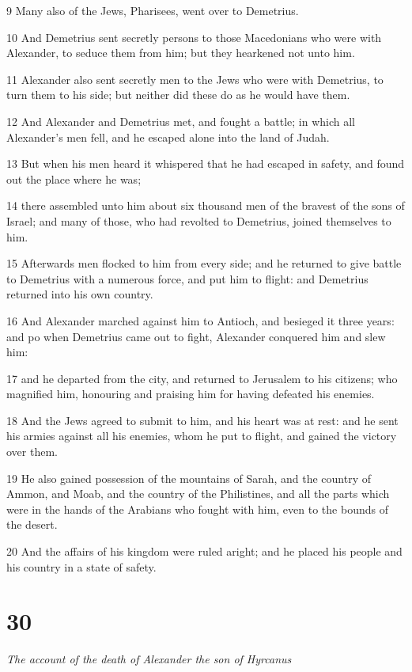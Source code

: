 9 Many also of the Jews, Pharisees, went over to Demetrius. 

10 And Demetrius sent secretly persons to those Macedonians who were with Alexander, to seduce them from him; but they hearkened not unto him. 

11 Alexander also sent secretly men to the Jews who were with Demetrius, to turn them to his side; but neither did these do as he would have them. 

12 And Alexander and Demetrius met, and fought a battle; in which all Alexander’s men fell, and he escaped alone into the land of Judah. 

13 But when his men heard it whispered that he had escaped in safety, and found out the place where he was; 

14 there assembled unto him about six thousand men of the bravest of the sons of Israel; and many of those, who had revolted to Demetrius, joined themselves to him. 

15 Afterwards men flocked to him from every side; and he returned to give battle to Demetrius with a numerous force, and put him to flight: and Demetrius returned into his own country. 

16 And Alexander marched against him to Antioch, and besieged it three years: and po when Demetrius came out to fight, Alexander conquered him and slew him: 

17 and he departed from the city, and returned to Jerusalem to his citizens; who magnified him, honouring and praising him for having defeated his enemies. 

18 And the Jews agreed to submit to him, and his heart was at rest: and he sent his armies against all his enemies, whom he put to flight, and gained the victory over them. 

19 He also gained possession of the mountains of Sarah, and the country of Ammon, and Moab, and the country of the Philistines, and all the parts which were in the hands of the Arabians who fought with him, even to the bounds of the desert. 

20 And the affairs of his kingdom were ruled aright; and he placed his people and his country in a state of safety. 

\chapter{30}

\par \textit{The account of the death of Alexander the son of Hyrcanus}

